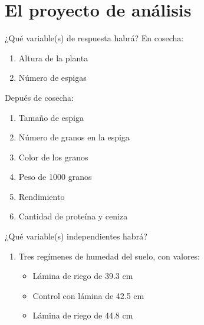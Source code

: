 \documentclass[
  11pt,
  ignorenonframetext,
]{beamer}
\providecommand{\tightlist}{%
  \setlength{\itemsep}{0pt}\setlength{\parskip}{0pt}}
\begin{document}
\hypertarget{el-proyecto-de-anuxe1lisis}{%
\section{El proyecto de análisis}\label{el-proyecto-de-anuxe1lisis}}

\begin{frame}{¿Qué variable(s) de respuesta habrá?}
\protect\hypertarget{quuxe9-variables-de-respuesta-habruxe1}{}
En cosecha:

\begin{enumerate}
\tightlist
\item
  Altura de la planta
\item
  Número de espigas
\end{enumerate}

Depués de cosecha:

\begin{enumerate}
\tightlist
\item
  Tamaño de espiga
\item
  Número de granos en la espiga
\item
  Color de los granos
\item
  Peso de 1000 granos
\item
  Rendimiento
\item
  Cantidad de proteína y ceniza
\end{enumerate}
\end{frame}

\begin{frame}{¿Qué variable(s) independientes habrá?}
\protect\hypertarget{quuxe9-variables-independientes-habruxe1}{}
\begin{enumerate}
\item
  Tres regímenes de humedad del suelo, con valores:

  \begin{itemize}
  \tightlist
  \item
    Lámina de riego de 39.3 cm
  \item
    Control con lámina de 42.5 cm
  \item
    Lámina de riego de 44.8 cm
  \end{itemize}
\end{enumerate}
\end{frame}
\end{document}
